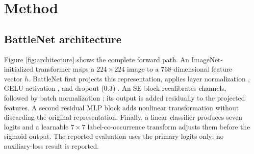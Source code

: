 \documentclass[conference]{IEEEtran}
\begin{document}
\section{Method}
\subsection{BattleNet architecture}
Figure \ref{fig:architecture} shows the complete forward path. An ImageNet-initialized transformer maps a $224\times224$ image to a 768-dimensional feature vector $h$. BattleNet first projects this representation, applies layer normalization \cite{ba2016layer}, GELU activation \cite{hendrycks2016gelu}, and dropout ($0.3$) \cite{srivastava2014dropout}. An SE block recalibrates channels, followed by batch normalization \cite{ioffe2015batch}; its output is added residually to the projected features. A second residual MLP block adds nonlinear transformation without discarding the original representation. Finally, a linear classifier produces seven logits and a learnable $7\times7$ label-co-occurrence transform adjusts them before the sigmoid output. The reported evaluation uses the primary logits only; no auxiliary-loss result is reported.
\end{document}
